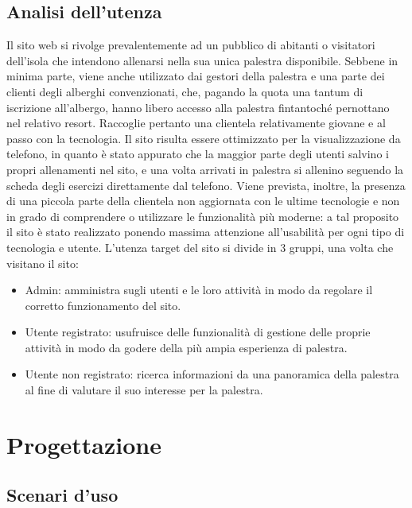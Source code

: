 \documentclass[a4paper]{article}
\begin{document}
    \subsection{Analisi dell’utenza}
    Il sito web si rivolge prevalentemente ad un pubblico di abitanti o visitatori dell’isola che intendono allenarsi nella sua unica palestra disponibile. Sebbene in minima parte, viene anche utilizzato dai gestori della palestra e una parte dei clienti degli alberghi convenzionati, che, pagando la quota una tantum di iscrizione all’albergo, hanno libero accesso alla palestra fintantoché pernottano nel relativo resort. Raccoglie pertanto una clientela relativamente giovane e al passo con la tecnologia. Il sito risulta essere ottimizzato per la visualizzazione da telefono, in quanto è stato appurato che la maggior parte degli utenti salvino i propri allenamenti nel sito, e una volta arrivati in palestra si allenino seguendo la scheda degli esercizi direttamente dal telefono. Viene prevista, inoltre, la presenza di una piccola parte della clientela non aggiornata con le ultime tecnologie e non in grado di comprendere o utilizzare le funzionalità più moderne: a tal proposito il sito è stato realizzato ponendo massima attenzione all’usabilità per ogni tipo di tecnologia e utente. L’utenza target del sito si divide in 3 gruppi, una volta che visitano il sito:
    \begin{itemize}
        \item Admin: amministra sugli utenti e le loro attività in modo da regolare il corretto funzionamento del sito.
        \item Utente registrato: usufruisce delle funzionalità di gestione delle proprie attività in modo da godere della più ampia esperienza di palestra.
        \item Utente non registrato: ricerca informazioni da una panoramica della palestra al fine di valutare il suo interesse per la palestra.
        
    \end{itemize}

    \section{Progettazione}

    \subsection{Scenari d’uso}
\end{document}
